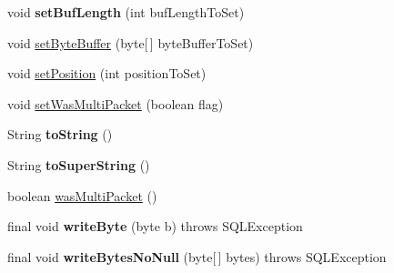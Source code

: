 \begin{DoxyCompactItemize}
void {\bfseries set\+Buf\+Length} (int buf\+Length\+To\+Set)
\item 
void \mbox{\hyperlink{classcom_1_1mysql_1_1jdbc_1_1_buffer_ad00a61ce402f1bfaf796e15cd2e70a8d}{set\+Byte\+Buffer}} (byte\mbox{[}$\,$\mbox{]} byte\+Buffer\+To\+Set)
\item 
void \mbox{\hyperlink{classcom_1_1mysql_1_1jdbc_1_1_buffer_a88b04735cd68d8d1772d176c3ac4542a}{set\+Position}} (int position\+To\+Set)
\item 
void \mbox{\hyperlink{classcom_1_1mysql_1_1jdbc_1_1_buffer_a51b92498f9644d69555e3770986d3ad4}{set\+Was\+Multi\+Packet}} (boolean flag)
\item 
\mbox{\label{classcom_1_1mysql_1_1jdbc_1_1_buffer_aea1fea5839ec7ecc4f4030174a94a255}} 
String {\bfseries to\+String} ()
\item 
\mbox{\label{classcom_1_1mysql_1_1jdbc_1_1_buffer_a8923166bdd8d0138cacddfde13a736a2}} 
String {\bfseries to\+Super\+String} ()
\item 
boolean \mbox{\hyperlink{classcom_1_1mysql_1_1jdbc_1_1_buffer_a3fce81ada28c621352873af28ff8e1fb}{was\+Multi\+Packet}} ()
\item 
\mbox{\label{classcom_1_1mysql_1_1jdbc_1_1_buffer_a1fe73e4f76f2d4834a30fcaf321e364c}} 
final void {\bfseries write\+Byte} (byte b)  throws S\+Q\+L\+Exception 
\item 
\mbox{\label{classcom_1_1mysql_1_1jdbc_1_1_buffer_a7594cd7d495e30109ec9980fb65ea648}} 
final void {\bfseries write\+Bytes\+No\+Null} (byte\mbox{[}$\,$\mbox{]} bytes)  throws S\+Q\+L\+Exception 
\end{DoxyCompactItemize}
